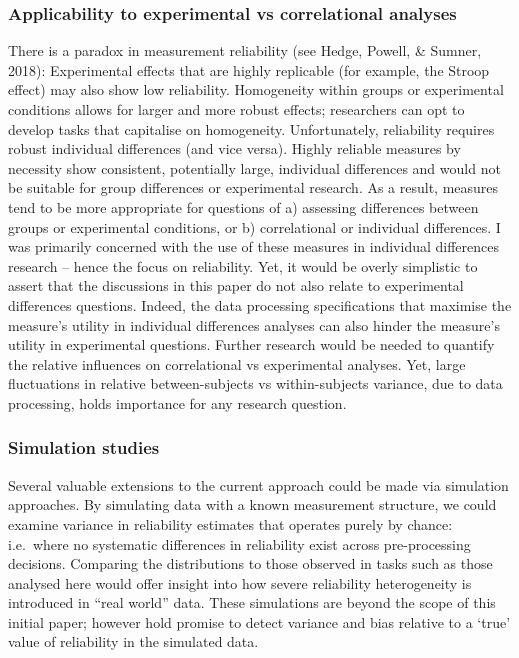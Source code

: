 \documentclass[
  english,
  man,floatsintext]{apa6}
\begin{document}
\hypertarget{applicability-to-experimental-vs-correlational-analyses}{%
\subsubsection{Applicability to experimental vs correlational analyses}\label{applicability-to-experimental-vs-correlational-analyses}}

There is a paradox in measurement reliability (see Hedge, Powell, \& Sumner, 2018): Experimental effects that are highly replicable (for example, the Stroop effect) may also show low reliability. Homogeneity within groups or experimental conditions allows for larger and more robust effects; researchers can opt to develop tasks that capitalise on homogeneity. Unfortunately, reliability requires robust individual differences (and vice versa). Highly reliable measures by necessity show consistent, potentially large, individual differences and would not be suitable for group differences or experimental research. As a result, measures tend to be more appropriate for questions of a) assessing differences between groups or experimental conditions, or b) correlational or individual differences. I was primarily concerned with the use of these measures in individual differences research -- hence the focus on reliability. Yet, it would be overly simplistic to assert that the discussions in this paper do not also relate to experimental differences questions. Indeed, the data processing specifications that maximise the measure's utility in individual differences analyses can also hinder the measure's utility in experimental questions. Further research would be needed to quantify the relative influences on correlational vs experimental analyses. Yet, large fluctuations in relative between-subjects vs within-subjects variance, due to data processing, holds importance for any research question.

\hypertarget{simulation-studies}{%
\subsubsection{Simulation studies}\label{simulation-studies}}

Several valuable extensions to the current approach could be made via simulation approaches. By simulating data with a known measurement structure, we could examine variance in reliability estimates that operates purely by chance: i.e.~where no systematic differences in reliability exist across pre-processing decisions. Comparing the distributions to those observed in tasks such as those analysed here would offer insight into how severe reliability heterogeneity is introduced in ``real world'' data. These simulations are beyond the scope of this initial paper; however hold promise to detect variance and bias relative to a `true' value of reliability in the simulated data.
\end{document}
